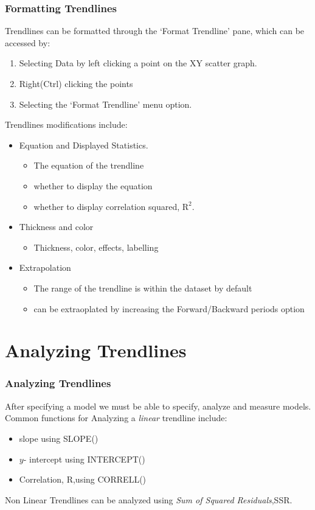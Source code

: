 \documentclass[12pt]{beamer}
\begin{document}
	\begin{frame}
		\frametitle{Formatting Trendlines}
		Trendlines can be formatted through the `Format Trendline' pane, which can be accessed by:
		\begin{enumerate}
			\item Selecting Data by left clicking a point on the XY scatter graph.
			\item Right(Ctrl) clicking the points
			\item Selecting the `Format Trendline' menu option.
		\end{enumerate} 
	\bigskip
		Trendlines modifications include:
			\begin{itemize}
				\item Equation and Displayed Statistics.
					\begin{itemize}
						\item The equation of the trendline
						\item whether to display the equation
						\item whether to display correlation squared, $\text{R}^2$. 
					\end{itemize} 
				\item Thickness and color
					\begin{itemize}
						\item  Thickness, color, effects, labelling 
					\end{itemize}
				\item Extrapolation
					\begin{itemize}
						\item The range of the trendline is within the dataset by default
						\item can be extraoplated by increasing the Forward/Backward periods option
					\end{itemize}
		\end{itemize}
	\end{frame}
\section{Analyzing Trendlines}
	\begin{frame}
		\frametitle{Analyzing Trendlines}
		After specifying a model we must be able to specify, analyze and measure models. 
		Common functions for Analyzing a \textit{linear} trendline include:
		\begin{itemize}
			\item slope using SLOPE()
			\item $y$- intercept using INTERCEPT()
			\item Correlation, R,using CORRELL()
		\end{itemize}
		Non Linear Trendlines can be analyzed using \textit{Sum of Squared Residuals},SSR. 
	\end{frame}
\end{document}
